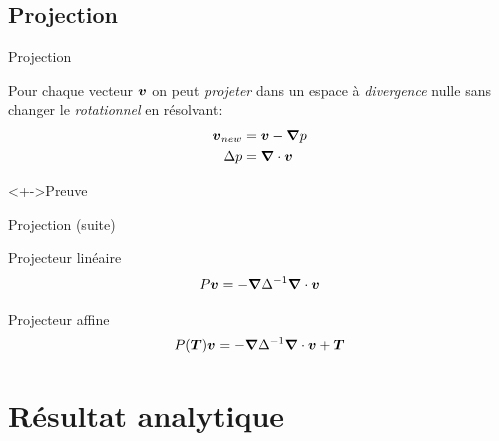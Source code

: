 \subsection{Projection}
\begin{frame}{Projection}
 
 \begin{property}
 Pour chaque vecteur ${\boldsymbol {v}}$ on peut \emph{projeter} dans un espace à \emph{divergence} nulle sans changer le \emph{rotationnel} en résolvant:
  \begin{align*}
  {\boldsymbol {v}}_{new}&={\boldsymbol {v}}-{\boldsymbol {\nabla}} p\\
  \Delta p&={\boldsymbol {\nabla}} \cdot {\boldsymbol {v}}
  \end{align*}
\begin{block}<+->{Preuve}
 \end{block}
 \end{property}
 
\end{frame}

\begin{frame}[<+->]{Projection (suite)}
  \begin{definition}{Projecteur linéaire}
  \begin{equation*}
   P{\boldsymbol {v}}=-{\boldsymbol {\nabla}}\Delta^{-1}{\boldsymbol {\nabla}}\cdot {\boldsymbol {v}}
  \end{equation*}
 \end{definition}
 
  \begin{definition}{Projecteur affine}
  \begin{equation*}
   P({\boldsymbol {T}}){\boldsymbol {v}}=-{\boldsymbol {\nabla}}\Delta^{-1}{\boldsymbol {\nabla}}\cdot {\boldsymbol {v}}+{\boldsymbol {T}}
  \end{equation*}
 \end{definition}
\end{frame}


\section{Résultat analytique}

